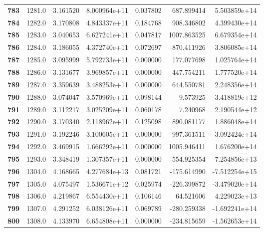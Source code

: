 \documentclass{report}[12pt]
\begin{document}
\begin{center}
\begin{tabular}{lrrrrrr}
\textbf{783 } &         1281.0 &   3.161520 &  8.000964e+11 &    0.037802 &   687.899414 &  5.503859e+14 \\
\textbf{784 } &         1282.0 &   3.170808 &  4.843337e+11 &    0.184768 &   908.346802 &  4.399430e+14 \\
\textbf{785 } &         1283.0 &   3.040653 &  6.627241e+11 &    0.047817 &  1007.863525 &  6.679354e+14 \\
\textbf{786 } &         1284.0 &   3.186055 &  4.372740e+11 &    0.072697 &   870.411926 &  3.806085e+14 \\
\textbf{787 } &         1285.0 &   3.095999 &  5.792733e+11 &    0.000000 &   177.077698 &  1.025764e+14 \\
\textbf{788 } &         1286.0 &   3.131677 &  3.969857e+11 &    0.000000 &   447.754211 &  1.777520e+14 \\
\textbf{789 } &         1287.0 &   3.359639 &  3.488253e+11 &    0.000000 &   644.550781 &  2.248356e+14 \\
\textbf{790 } &         1288.0 &   3.074047 &  3.570969e+11 &    0.098144 &     9.573925 &  3.418819e+12 \\
\textbf{791 } &         1289.0 &   3.112217 &  3.025209e+11 &    0.060178 &     7.240968 &  2.190544e+12 \\
\textbf{792 } &         1290.0 &   3.170340 &  2.118962e+11 &    0.125098 &   890.081177 &  1.886048e+14 \\
\textbf{793 } &         1291.0 &   3.192246 &  3.100605e+11 &    0.000000 &   997.361511 &  3.092424e+14 \\
\textbf{794 } &         1292.0 &   3.469915 &  1.666292e+11 &    0.000000 &  1005.946411 &  1.676200e+14 \\
\textbf{795 } &         1293.0 &   3.348419 &  1.307357e+11 &    0.000000 &   554.925354 &  7.254856e+13 \\
\textbf{796 } &         1304.0 &   4.168665 &  4.277684e+13 &    0.081721 &  -175.614990 & -7.512254e+15 \\
\textbf{797 } &         1305.0 &   4.075497 &  1.536671e+12 &    0.025974 &  -226.399872 & -3.479020e+14 \\
\textbf{798 } &         1306.0 &   4.219867 &  6.554430e+11 &    0.106146 &    64.521606 &  4.229023e+13 \\
\textbf{799 } &         1307.0 &   4.291252 &  6.038126e+11 &    0.069789 &  -280.259338 & -1.692241e+14 \\
\textbf{800 } &         1308.0 &   4.133970 &  6.654808e+11 &    0.000000 &  -234.815659 & -1.562653e+14 \\

\end{tabular}
\end{center}
\end{document}
